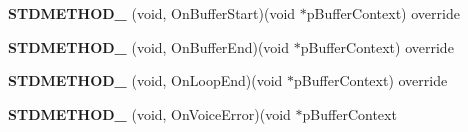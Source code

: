 \begin{DoxyCompactItemize}
{\bfseries S\+T\+D\+M\+E\+T\+H\+O\+D\+\_\+} (void, On\+Buffer\+Start)(void $\ast$p\+Buffer\+Context) override
\item 
\mbox{\label{classexperimental_1_1AudioPlayer_a0af61257ab48c94502805d195c1ea3ef}} 
{\bfseries S\+T\+D\+M\+E\+T\+H\+O\+D\+\_\+} (void, On\+Buffer\+End)(void $\ast$p\+Buffer\+Context) override
\item 
\mbox{\label{classexperimental_1_1AudioPlayer_a9a2fc1f724f5bf4628eb24e979c991f2}} 
{\bfseries S\+T\+D\+M\+E\+T\+H\+O\+D\+\_\+} (void, On\+Loop\+End)(void $\ast$p\+Buffer\+Context) override
\item 
\mbox{\label{classexperimental_1_1AudioPlayer_a37ef819842877ab4dea86e1b011583f7}} 
{\bfseries S\+T\+D\+M\+E\+T\+H\+O\+D\+\_\+} (void, On\+Voice\+Error)(void $\ast$p\+Buffer\+Context
\end{DoxyCompactItemize}

